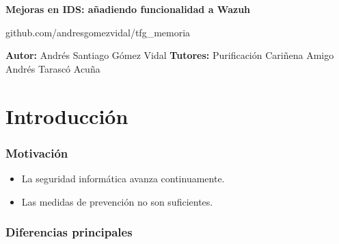 \documentclass[a4paper,10pt]{beamer}
\newcommand{\linej}{\hfill\break}
\begin{document}
\begin{frame}[fragile]
	\linej
	\linej
	\linej
	\large
	\centerline{\textbf{Mejoras en IDS: añadiendo funcionalidad a Wazuh}}
	\normalsize
	\linej
	\linej
	\centerline{github.com/andresgomezvidal/tfg\_memoria}
	\linej
	\linej
	\begin{multicols}{2}
	\textbf{Autor:}
	\linej
		Andrés Santiago Gómez Vidal
	\linej
	\columnbreak
	\linej
	\textbf{Tutores:}
	\linej
		Purificación Cariñena Amigo
	\linej
		Andrés Tarascó Acuña
	\end{multicols}

\end{frame}


\section{Introducción}
\begin{frame}[fragile]
	\frametitle{Motivación}

	\begin{itemize}
		\item La seguridad informática avanza continuamente. %
		\item Las medidas de prevención no son suficientes. %
	\end{itemize}
\end{frame}

\begin{frame}[fragile]
	\frametitle{Diferencias principales}
\end{frame}
\end{document}
